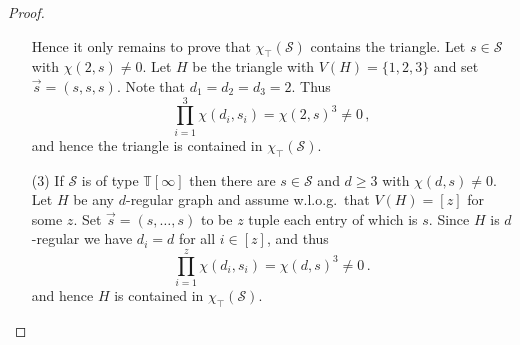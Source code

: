 \documentclass[authorcolumns,numberwithinsect]{no-lipics-v2022}
\newcommand{\homsupp}{\chi}
\begin{document}
\begin{proof}
\begin{itemize}
        Hence it only remains to prove that $\homsupp_\top(\mathcal{S})$ contains the triangle.
        Let $s\in \mathcal{S}$ with $\chi(2,s)\neq 0$. Let $H$ be the triangle with $V(H)=\{1,2,3\}$ and set $\vec{s}=(s,s,s)$. Note that $d_1=d_2=d_3 =2$. Thus 
        \[ \prod_{i=1}^3 \chi(d_i,s_i) = \chi(2,s)^3 \neq 0\,,\]
        and hence the triangle is contained in $\homsupp_\top(\mathcal{S})$.
        \item[(3)] If $\mathcal{S}$ is of type $\mathbb{T}[\infty]$ then there are $s\in \mathcal{S}$ and $d\geq 3$ with $\chi(d,s)\neq 0$.
        Let $H$ be any $d$-regular graph and assume w.l.o.g.\ that $V(H)=[z]$ for some $z$. Set $\vec{s}=(s,\dots,s)$ to be $z$ tuple each entry of which is $s$. Since $H$ is $d$-regular we have $d_i=d$ for all $i\in [z]$, and thus
        \[ \prod_{i=1}^z \chi(d_i,s_i) = \chi(d,s)^3 \neq 0\,.\]
        and hence $H$ is contained in $\homsupp_\top(\mathcal{S})$.
    \end{itemize}
\end{proof}
\end{document}
